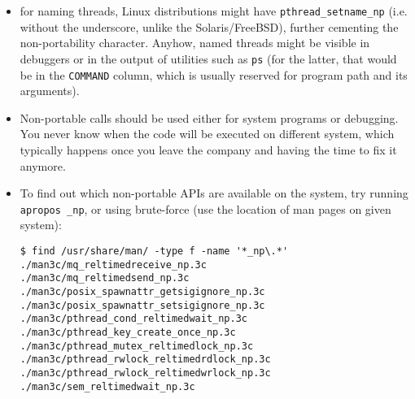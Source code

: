 \begin{itemize}
\item for naming threads, Linux distributions might have
\texttt{pthread\_setname\_np} (i.e. without the underscore, unlike the
Solaris/FreeBSD), further cementing the non-portability character.
Anyhow, named threads might be visible in debuggers or in the output
of utilities such as \texttt{ps} (for the latter, that would be in the
\texttt{COMMAND} column, which is usually reserved for program path and its
arguments).
\item Non-portable calls should be used either for system programs or
debugging. You never know when the code will be executed on different system,
which typically happens once you leave the company and having the time to
fix it anymore.
\item To find out which non-portable APIs are available on the system,
try running \texttt{apropos \_np}, or using brute-force (use the location
of man pages on given system):
\begin{verbatim}
$ find /usr/share/man/ -type f -name '*_np\.*'
./man3c/mq_reltimedreceive_np.3c
./man3c/mq_reltimedsend_np.3c
./man3c/posix_spawnattr_getsigignore_np.3c
./man3c/posix_spawnattr_setsigignore_np.3c
./man3c/pthread_cond_reltimedwait_np.3c
./man3c/pthread_key_create_once_np.3c
./man3c/pthread_mutex_reltimedlock_np.3c
./man3c/pthread_rwlock_reltimedrdlock_np.3c
./man3c/pthread_rwlock_reltimedwrlock_np.3c
./man3c/sem_reltimedwait_np.3c
\end{verbatim}
\end{itemize}

\pagebreak

\endinput

